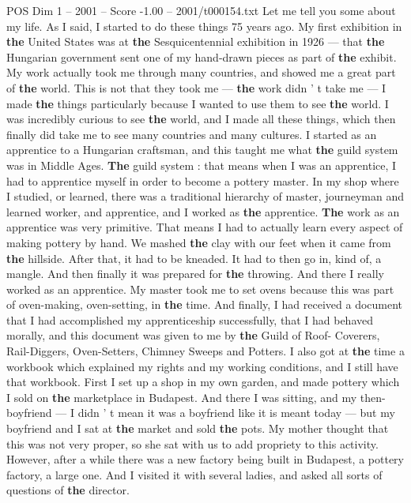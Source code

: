 \begin{textsample}{POS Dim 1 – 2001 – Score -1.00 – 2001/t000154.txt}
Let me tell you some about my life.
As I said, I started to do these things 75 years ago.
My first exhibition in \textbf{the} United States was at \textbf{the} Sesquicentennial exhibition in 1926 — that \textbf{the} Hungarian government sent one of my hand-drawn pieces as part of \textbf{the} exhibit.
My work actually took me through many countries, and showed me a great part of \textbf{the} world.
This is not that they took me — \textbf{the} work didn ' t take me — I made \textbf{the} things particularly because I wanted to use them to see \textbf{the} world.
I was incredibly curious to see \textbf{the} world, and I made all these things, which then finally did take me to see many countries and many cultures.
I started as an apprentice to a Hungarian craftsman, and this taught me what \textbf{the} guild system was in Middle Ages. \textbf{The} guild system : that means when I was an apprentice, I had to apprentice myself in order to become a pottery master.
In my shop where I studied, or learned, there was a traditional hierarchy of master, journeyman and learned worker, and apprentice, and I worked as \textbf{the} apprentice. \textbf{The} work as an apprentice was very primitive.
That means I had to actually learn every aspect of making pottery by hand.
We mashed \textbf{the} clay with our feet when it came from \textbf{the} hillside.
After that, it had to be kneaded.
It had to then go in, kind of, a mangle.
And then finally it was prepared for \textbf{the} throwing.
And there I really worked as an apprentice.
My master took me to set ovens because this was part of oven-making, oven-setting, in \textbf{the} time.
And finally, I had received a document that I had accomplished my apprenticeship successfully, that I had behaved morally, and this document was given to me by \textbf{the} Guild of Roof- Coverers, Rail-Diggers, Oven-Setters, Chimney Sweeps and Potters.
I also got at \textbf{the} time a workbook which explained my rights and my working conditions, and I still have that workbook.
First I set up a shop in my own garden, and made pottery which I sold on \textbf{the} marketplace in Budapest.
And there I was sitting, and my then-boyfriend — I didn ' t mean it was a boyfriend like it is meant today — but my boyfriend and I sat at \textbf{the} market and sold \textbf{the} pots.
My mother thought that this was not very proper, so she sat with us to add propriety to this activity.
However, after a while there was a new factory being built in Budapest, a pottery factory, a large one.
And I visited it with several ladies, and asked all sorts of questions of \textbf{the} director.

\end{textsample}
